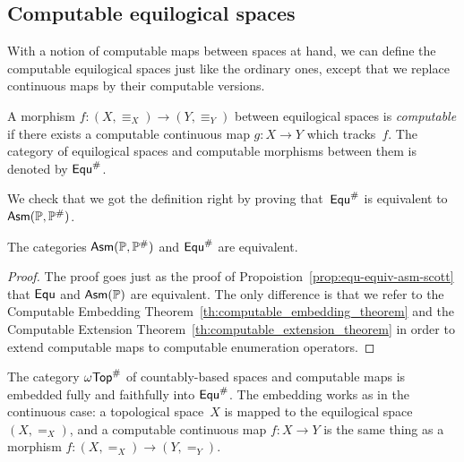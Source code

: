 
\subsection{Computable equilogical spaces}
\label{sec:computable-equ}


With a notion of computable maps between spaces at hand, we can define
the computable equilogical spaces just like the ordinary ones, except
that we replace continuous maps by their computable versions.

\begin{definition}
  \label{def:computable-equ}%
  A morphism $f : (X, {\equiv_X}) \to (Y, {\equiv_Y})$ between
  equilogical spaces is \emph{computable} if there exists a computable
  continuous map $g : X \to Y$ which tracks~$f$.
  The category of equilogical spaces and computable morphisms between
  them is denoted by $\mathsf{Equ}^{\#}$.
\end{definition}

We check that we got the definition right by proving
that~$\mathsf{Equ}^{\#}$ is equivalent to $\mathsf{Asm}(\mathbb{P}, \mathbb{P}^{\#})$.

\begin{proposition}
  \label{th:equivalence_compEqu_AsmScott}%
  The categories $\mathsf{Asm}(\mathbb{P}, \mathbb{P}^{\#})$ and $\mathsf{Equ}^{\#}$ are
  equivalent.
\end{proposition}

\begin{proof}
  The proof goes just as the proof of
  Propoistion~\ref{prop:equ-equiv-asm-scott} that $\mathsf{Equ}$ and
  $\mathsf{Asm}(\mathbb{P})$ are equivalent. The only difference is that we refer
  to the Computable Embedding
  Theorem~\ref{th:computable_embedding_theorem} and the Computable
  Extension Theorem~\ref{th:computable_extension_theorem} in order to
  extend computable maps to computable enumeration operators.
\end{proof}

The category $\mathsf{\omega Top}^{\#}$ of countably-based spaces and computable
maps is embedded fully and faithfully into $\mathsf{Equ}^{\#}$. The
embedding works as in the continuous case: a topological space~$X$ is
mapped to the equilogical space $(X, {=_X})$, and a computable
continuous map $f : X \to Y$ is the same thing as a morphism $f : (X,
{=_X}) \to (Y, {=_Y})$.


